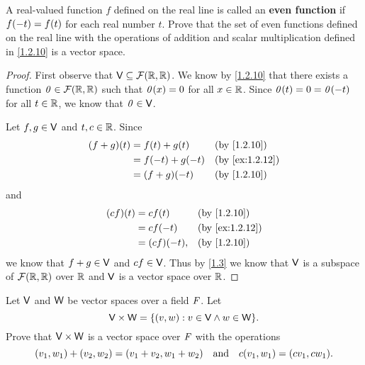 \begin{ex}\label{ex:1.2.12}
  A real-valued function \(f\) defined on the real line is called an \textbf{even function} if \(f\p{-t} = f\p{t}\) for each real number \(t\).
  Prove that the set of even functions defined on the real line with the operations of addition and scalar multiplication defined in \cref{1.2.10} is a vector space.
\end{ex}

\begin{proof}
  First observe that \(\V \subseteq \fs{\R}{\R}\).
  We know by \cref{1.2.10} that there exists a function \(\zv \in \fs{\R}{\R}\) such that \(\mathit{0}(x) = 0\) for all \(x \in \mathbb{R}\).
  Since \(\mathit{0}(t) = 0 = \mathit{0}(-t)\) for all \(t \in \mathbb{R}\), we know that \(\mathit{0} \in \mathsf{V}\).

  Let \(f, g \in \mathsf{V}\) and \(t, c \in \mathbb{R}\).
  Since
  \begin{align*}
    \p{f + g}\p{t} & = f\p{t} + g\p{t}   &  & \text{(by \cref{1.2.10})}    \\
                   & = f\p{-t} + g\p{-t} &  & \text{(by \cref{ex:1.2.12})} \\
                   & = \p{f + g}\p{-t}   &  & \text{(by \cref{1.2.10})}
  \end{align*}
  and
  \begin{align*}
    \p{cf}\p{t} & = cf\p{t}       &  & \text{(by \cref{1.2.10})}    \\
                & = cf\p{-t}      &  & \text{(by \cref{ex:1.2.12})} \\
                & = \p{cf}\p{-t}, &  & \text{(by \cref{1.2.10})}
  \end{align*}
  we know that \(f + g \in \mathsf{V}\) and \(cf \in \mathsf{V}\).
  Thus by \cref{1.3} we know that \(\mathsf{V}\) is a subspace of \(\fs{\R}{\R}\) over \(\mathbb{R}\) and \(\mathsf{V}\) is a vector space over \(\mathbb{R}\).
\end{proof}

\setcounter{ex}{20}
\begin{ex}\label{ex:1.2.21}
  Let \(\mathsf{V}\) and \(\mathsf{W}\) be vector spaces over a field \(\mathit{F}\).
  Let
  \[
    \V \times \W = \set{\p{v, w} : v \in \V \land w \in \W}.
  \]
  Prove that \(\mathsf{V} \times \mathsf{W}\) is a vector space over \(\mathit{F}\) with the operations
  \[
    \p{v_1, w_1} + \p{v_2, w_2} = \p{v_1 + v_2, w_1 + w_2} \quad \text{and} \quad c\p{v_1, w_1} = \p{cv_1, cw_1}.
  \]
\end{ex}

